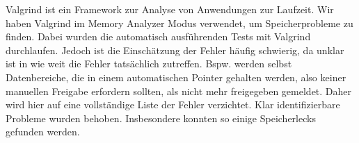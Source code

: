 Valgrind ist ein Framework zur Analyse von Anwendungen zur Laufzeit. Wir haben Valgrind im Memory Analyzer Modus verwendet, um Speicherprobleme zu finden. Dabei wurden die automatisch ausführenden Tests mit Valgrind durchlaufen. Jedoch ist die Einschätzung der Fehler häufig schwierig, da unklar ist in wie weit die Fehler tatsächlich zutreffen. Bspw. werden selbst Datenbereiche, die in einem automatischen Pointer gehalten werden, also keiner manuellen Freigabe erfordern sollten, als nicht mehr freigegeben gemeldet. Daher wird hier auf eine vollständige Liste der Fehler verzichtet. Klar identifizierbare Probleme wurden behoben. Insbesondere konnten so einige Speicherlecks gefunden werden.